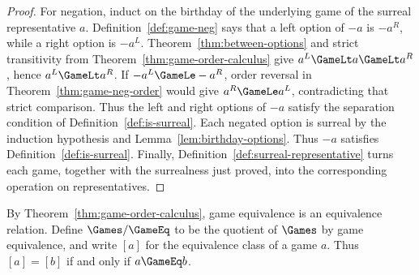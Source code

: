 \begin{proof}
  For negation, induct on the birthday of the underlying game of the surreal
  representative \(a\).  Definition~\ref{def:game-neg} says that
  a left option of \(-a\) is \(-a^R\), while a right option is \(-a^L\).
  Theorem~\ref{thm:between-options} and strict transitivity from
  Theorem~\ref{thm:game-order-calculus} give
  \(a^L\GameLt a\GameLt a^R\), hence \(a^L\GameLt a^R\).  If
  \(-a^L\GameLe-a^R\), order reversal in
  Theorem~\ref{thm:game-neg-order} would give \(a^R\GameLe a^L\), contradicting
  that strict comparison.  Thus the left and right options of \(-a\) satisfy
  the separation condition of Definition~\ref{def:is-surreal}.
  Each negated option is surreal by the induction hypothesis and
  Lemma~\ref{lem:birthday-options}.  Thus \(-a\) satisfies
  Definition~\ref{def:is-surreal}.  Finally, Definition~\ref{def:surreal-representative}
  turns each game, together with the surrealness just proved, into the
  corresponding operation on representatives.
\end{proof}

\begin{definition}
  \label{def:game-quotient}
  \leanok
  By Theorem~\ref{thm:game-order-calculus}, game equivalence is an equivalence relation.
  Define \(\Games/{\GameEq}\) to be the quotient of \(\Games\) by game equivalence, and
  write \([a]\) for the equivalence class of a game \(a\).  Thus \([a]=[b]\) if and only
  if \(a\GameEq b\).
\end{definition}

